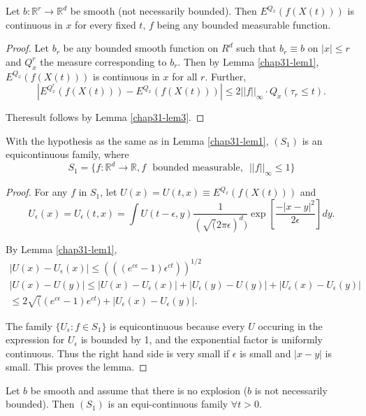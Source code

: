 \begin{lemma}\label{chap31-lem4}
Let $b:\mathbb{R}^{r}\to \mathbb{R}^{d}$ be smooth (not necessarily
bounded). Then 
$E^{Q_{x}}(f(X(t)))$ is continuous in $x$ for every fixed $t$, $f$
being any bounded measurable function.
\end{lemma}

\begin{proof}
Let $b_{r}$ be any bounded smooth function on $R^{d}$ such that
$b_{r}\equiv b$ on $|x|\leq r$ and $Q^{r}_{x}$ the measure
corresponding to $b_{r}$. Then by Lemma \ref{chap31-lem1},
$E^{Q_{x}}(f(X(t)))$ is continuous in $x$ for all $r$. Further,
$$
|E^{Q^{r}_{x}}(f(X(t)))-E^{Q_{x}}(f(X(t)))|\leq 2||f||_{\infty}\cdot
Q_{x}(\tau_{r}\leq t).
$$

The\pageoriginale result follows by Lemma \ref{chap31-lem3}.
\end{proof}

\begin{lemma}\label{chap31-lem5}
With the hypothesis as the same as in Lemma \ref{chap31-lem1},
$(S_{1})$ is an equicontinuous family, where
$$
S_{1}=\{f:\mathbb{R}^{d}\to \mathbb{R},f\text{~ bounded measurable,~ }
||f||_{\infty}\leq 1\}
$$
\end{lemma}

\begin{proof}
For any $f$ in $S_{1}$, let $U(x)=U(t,x)\equiv E^{Q_{x}}(f(X(t)))$ and
$$
U_{\epsilon}(x)=U_{\epsilon}(t,x)=\int U(t-\epsilon,y)\frac{1}{(\surd
  (2\pi\epsilon)^{d})}\exp
\left[\frac{-|x-y|^{2}}{2\epsilon}\right]dy. 
$$

By Lemma \ref{chap31-lem1},
\begin{gather*}
|U(x)-U_{\epsilon}(x)|\leq (((e^{c\epsilon}-1)\epsilon^{ct}))^{1/2}\\
|U(x)-U(y)|\leq
|U(x)-U_{\epsilon}(x)|+|U_{\epsilon}(y)-U(y)|+|U_{\epsilon}(x)-U_{\epsilon}(y)|\\
\leq 2\surd ((e^{c\epsilon}-1)e^{ct})+|U_{\epsilon}(x)-U_{\epsilon}(y)|.
\end{gather*}

The family $\{U_{\epsilon}:f\in S_{1}\}$ is equicontinuous because
every $U$ occuring in the expression for $U_{\epsilon}$ is bounded by
1, and the exponential factor is uniformly continuous. Thus the right
hand side is very small if $\epsilon$ is small and $|x-y|$ is
small. This proves the lemma.
\end{proof}

\begin{lemma}\label{chap31-lem6}
Let $b$ be smooth and assume that there is no explosion ($b$ is not
necessarily bounded). Then $(S_{1})$ is an equi-continuous family
$\forall t>0$.
\end{lemma}

